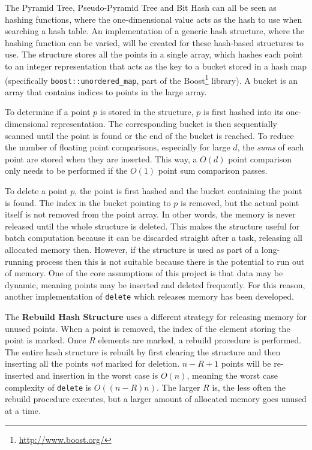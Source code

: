 The Pyramid Tree, Pseudo-Pyramid Tree and Bit Hash can all be seen as hashing functions, where the one-dimensional value acts as the hash to use when searching a hash table.
An implementation of a generic hash structure, where the hashing function can be varied, will be created for these hash-based structures to use. The structure stores all the points in a single array, which hashes each point to an integer representation that acts as the key to a bucket stored in a hash map (specifically \texttt{boost::unordered\_map}, part of the Boost\footnote{\url{http://www.boost.org/}} library). A bucket is an array that contains indices to points in the large array.

To determine if a point $p$ is stored in the structure, $p$ is first hashed into its one-dimensional representation. The corresponding bucket is then sequentially scanned until the point is found or the end of the bucket is reached. To reduce the number of floating point comparisons, especially for large $d$, the \textit{sums} of each point are stored when they are inserted. This way, a $O(d)$ point comparison only needs to be performed if the $O(1)$ point sum comparison passes.

To delete a point $p$, the point is first hashed and the bucket containing the point is found. The index in the bucket pointing to $p$ is removed, but the actual point itself is not removed from the point array. In other words, the memory is never released until the whole structure is deleted. This makes the structure useful for batch computation because it can be discarded straight after a task, releasing all allocated memory then. However, if the structure is used as part of a long-running process then this is not suitable because there is the potential to run out of memory.  One of the core assumptions of this project is that data may be dynamic, meaning points may be inserted and deleted frequently. For this reason, another implementation of \texttt{delete} which releases memory has been developed.

The \textbf{Rebuild Hash Structure} uses a different strategy for releasing memory for unused points. When a point is removed, the index of the element storing the point is marked. Once $R$ elements are marked, a rebuild procedure is performed. The entire hash structure is rebuilt by first clearing the structure and then inserting all the points \textit{not} marked for deletion. $n - R + 1$ points will be re-inserted and insertion in the worst case is $O(n)$, meaning the worst case complexity of \texttt{delete} is $O((n - R)n)$. The larger $R$ is, the less often the rebuild procedure executes, but a larger amount of allocated memory goes unused at a time.

